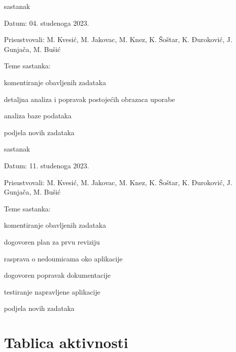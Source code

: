 \begin{packed_enum}
			\item  sastanak
			\item[] \begin{packed_item}
				\item Datum: 04. studenoga 2023.
				\item Prisustvovali: M. Kvesić, M. Jakovac, M. Knez, K. Šoštar, K. Đuroković, J. Gunjača, M. Bušić
				\item Teme sastanka:
				\begin{packed_item}
					\item  komentiranje obavljenih zadataka
					\item  detaljna analiza i popravak postojećih obrazaca uporabe
					\item  analiza baze podataka
					\item  podjela novih zadataka
				\end{packed_item}
			\end{packed_item}
			
			\item  sastanak
			\item[] \begin{packed_item}
				\item Datum: 11. studenoga 2023.
				\item Prisustvovali: M. Kvesić, M. Jakovac, M. Knez, K. Šoštar, K. Đuroković, J. Gunjača, M. Bušić
				\item Teme sastanka:
				\begin{packed_item}
					\item  komentiranje obavljenih zadataka
					\item  dogovoren plan za prvu reviziju
					\item  rasprava o nedoumicama oko aplikacije
					\item  dogovoren popravak dokumentacije
					\item  testiranje napravljene aplikacije
					\item  podjela novih zadataka
				\end{packed_item}
			\end{packed_item}
			
			 
			
			
		\end{packed_enum}
		
		\eject
		\section*{Tablica aktivnosti}
		

